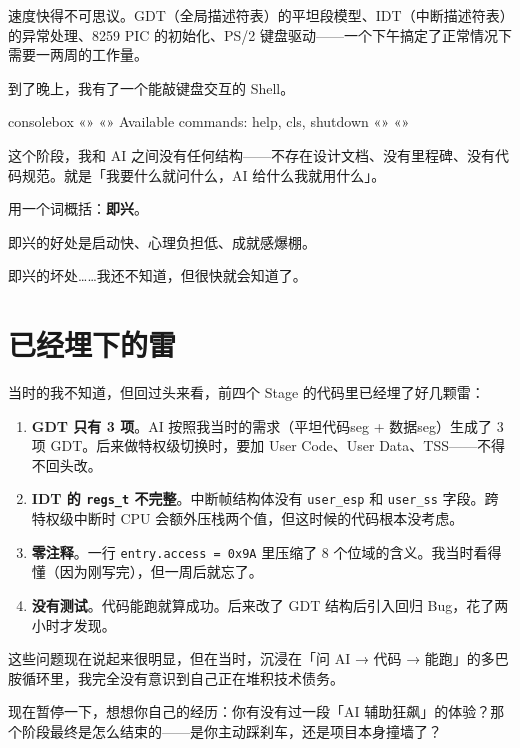 速度快得不可思议。GDT（全局描述符表）的平坦段模型、IDT（中断描述符表）的异常处理、8259 PIC 的初始化、PS/2 键盘驱动——一个下午搞定了正常情况下需要一两周的工作量。

到了晚上，我有了一个能敲键盘交互的 Shell。

\begin{tcblisting}{consolebox}
«\tpk{>}» «»
Available commands: help, cls, shutdown
«\tpk{>}» «»
\end{tcblisting}

这个阶段，我和 AI 之间没有任何结构——不存在设计文档、没有里程碑、没有代码规范。就是「我要什么就问什么，AI 给什么我就用什么」。

用一个词概括：\textbf{即兴}。

即兴的好处是启动快、心理负担低、成就感爆棚。

即兴的坏处……我还不知道，但很快就会知道了。

\section{已经埋下的雷}

当时的我不知道，但回过头来看，前四个 Stage 的代码里已经埋了好几颗雷：

\begin{enumerate}
  \item \textbf{GDT 只有 3 项}。AI 按照我当时的需求（平坦代码seg + 数据seg）生成了 3 项 GDT。后来做特权级切换时，要加 User Code、User Data、TSS——不得不回头改。
  \item \textbf{IDT 的 \texttt{regs\_t} 不完整}。中断帧结构体没有 \texttt{user\_esp} 和 \texttt{user\_ss} 字段。跨特权级中断时 CPU 会额外压栈两个值，但这时候的代码根本没考虑。
  \item \textbf{零注释}。一行 \texttt{entry.access = 0x9A} 里压缩了 8 个位域的含义。我当时看得懂（因为刚写完），但一周后就忘了。
  \item \textbf{没有测试}。代码能跑就算成功。后来改了 GDT 结构后引入回归 Bug，花了两小时才发现。
\end{enumerate}

这些问题现在说起来很明显，但在当时，沉浸在「问 AI → 代码 → 能跑」的多巴胺循环里，我完全没有意识到自己正在堆积技术债务。

\begin{thinkbox}
现在暂停一下，想想你自己的经历：你有没有过一段「AI 辅助狂飙」的体验？那个阶段最终是怎么结束的——是你主动踩刹车，还是项目本身撞墙了？
\end{thinkbox}

